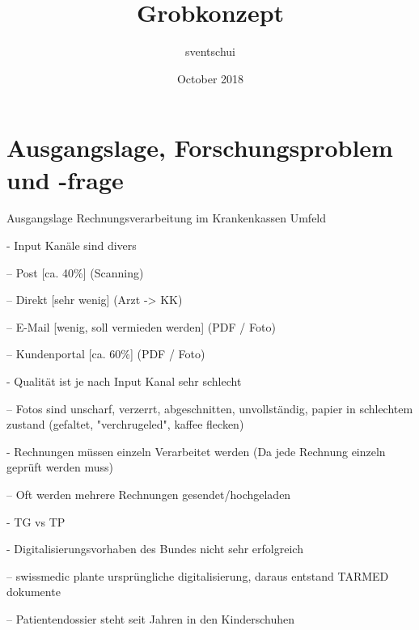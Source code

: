 \documentclass{article}
\title{Grobkonzept}
\author{sventschui }
\date{October 2018}
\begin{document}
\maketitle

\section{Ausgangslage, Forschungsproblem und -frage}



Ausgangslage Rechnungsverarbeitung im Krankenkassen Umfeld

- Input Kanäle sind divers

  -- Post [ca. 40\%] (Scanning)
  
  -- Direkt [sehr wenig] (Arzt -> KK)
  
  -- E-Mail [wenig, soll vermieden werden] (PDF / Foto)
  
  -- Kundenportal [ca. 60\%] (PDF / Foto)

- Qualität ist je nach Input Kanal sehr schlecht

  -- Fotos sind unscharf, verzerrt, abgeschnitten, unvollständig, papier in schlechtem zustand (gefaltet, "verchrugeled", kaffee flecken)

- Rechnungen müssen einzeln Verarbeitet werden (Da jede Rechnung einzeln geprüft werden muss)

  -- Oft werden mehrere Rechnungen gesendet/hochgeladen

- TG vs TP

- Digitalisierungsvorhaben des Bundes nicht sehr erfolgreich

  -- swissmedic plante ursprüngliche digitalisierung, daraus entstand TARMED dokumente

  -- Patientendossier steht seit Jahren in den Kinderschuhen
\end{document}

